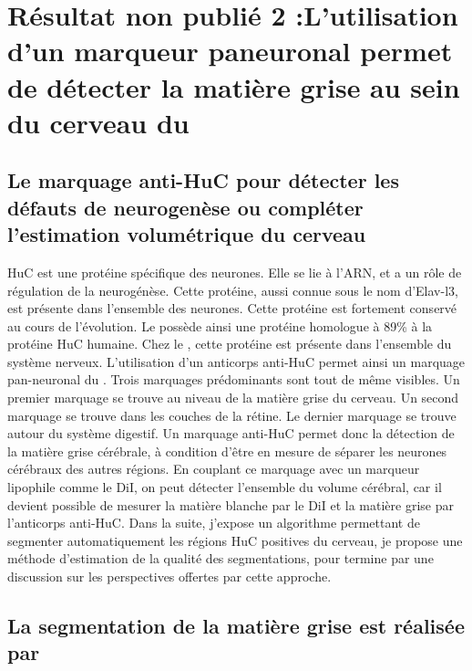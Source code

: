 \documentclass[\main/main.tex]{subfiles}
\begin{document}
                    
\chapter{Résultat non publié 2 :L'utilisation d'un marqueur paneuronal permet de détecter la matière grise au sein du cerveau du \pz{}
\label{sec:HuC}
}

    \section{Le marquage anti-HuC pour détecter les défauts de neurogenèse ou compléter l'estimation volumétrique du cerveau}

%
HuC est une protéine spécifique des neurones. Elle se lie à l'ARN, et a un rôle de régulation de la neurogénèse. Cette protéine, aussi connue sous le nom d'Elav-l3, est présente dans l'ensemble des neurones. Cette protéine est fortement conservé au cours de l'évolution. Le \pz{} possède ainsi une protéine homologue à 89\% à la protéine HuC humaine.
%
Chez le \pz{}, cette protéine est présente dans l'ensemble du système nerveux.
L'utilisation d'un anticorps anti-HuC permet ainsi un marquage pan-neuronal du \pz{}. Trois marquages prédominants sont tout de même visibles. Un premier marquage se trouve au niveau de la matière grise du cerveau. Un second marquage se trouve dans les couches de la rétine. Le dernier marquage se trouve autour du système digestif.
Un marquage anti-HuC permet donc la détection de la matière grise cérébrale, à condition d'être en mesure de séparer les neurones cérébraux des autres régions. En couplant ce marquage avec un marqueur lipophile comme le DiI, on peut détecter l'ensemble du volume cérébral, car il devient possible de mesurer la matière blanche par le DiI et la matière grise par l'anticorps anti-HuC.
Dans la suite, j'expose un algorithme permettant de segmenter automatiquement les régions HuC positives du cerveau, je propose une méthode d'estimation de la qualité des segmentations, pour termine par une discussion sur les perspectives offertes par cette approche.
    
    \section{La segmentation de la matière grise est réalisée par \watershed{}}
    
\end{document}
